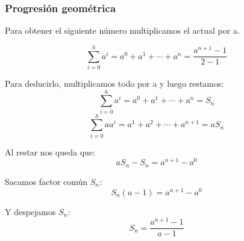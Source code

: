 \documentclass[10pt,a4paper,spanish]{report}
\begin{document}
\subsubsection{\textcolor[rgb]{0.1,0.2,0.6}Progresión geométrica}
\noindent
Para obtener el siguiente número multiplicamos el actual por a.

\begin{center}
\begin{displaymath}
\sum_{i=0}^h a^{i} = a^{0} + a^{1} + \cdots + a^{n} = \frac{a^{n+1} - 1}{2 - 1}
\end{displaymath}

Para deducirlo, multiplicamos todo por a y luego restamos:
\begin{displaymath}
\sum_{i=0}^h a^{i} = a^{0} + a^{1} + \cdots + a^{n} = S_{n}
\end{displaymath}
\begin{displaymath}
\sum_{i=0}^h a a^{i} = a^{1} + a^{2} + \cdots + a^{n+1} = aS_{n}
\end{displaymath}

Al restar nos queda que:
\begin{displaymath}
aS_{n} - S_{n} = a^{n+1} - a^{0}
\end{displaymath}

Sacamos factor común $S_{n}$:
\begin{displaymath}
S_{n}(a - 1) = a^{n+1} - a^{0}
\end{displaymath}

Y despejamos $S_{n}$:
\begin{displaymath}
S_{n} = \frac{a^{n+1} - 1}{a - 1}
\end{displaymath}
\end{center}
\end{document}

